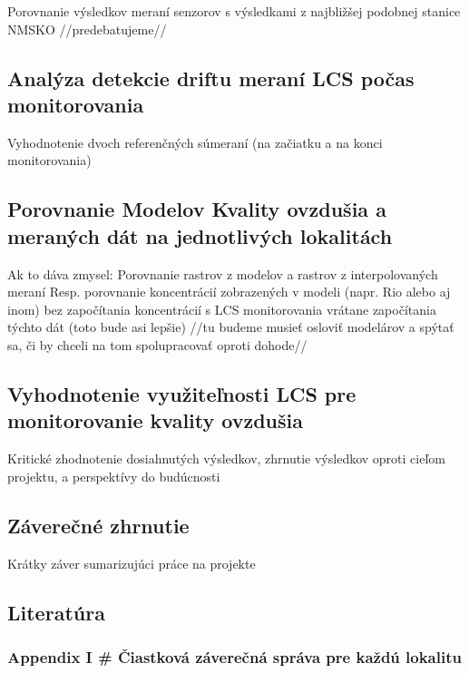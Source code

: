 \documentclass[
  slovak,
  letterpaper,
  DIV=11,
  numbers=noendperiod]{scrartcl}
\begin{document}
Porovnanie výsledkov meraní senzorov s výsledkami z najbližšej podobnej
stanice NMSKO //predebatujeme//

\subsection{Analýza detekcie driftu meraní LCS počas
monitorovania}\label{analuxfdza-detekcie-driftu-meranuxed-lcs-poux10das-monitorovania}

Vyhodnotenie dvoch referenčných súmeraní (na začiatku a na konci
monitorovania)

\subsection{Porovnanie Modelov Kvality ovzdušia a meraných dát na
jednotlivých
lokalitách}\label{porovnanie-modelov-kvality-ovzduux161ia-a-meranuxfdch-duxe1t-na-jednotlivuxfdch-lokalituxe1ch}

Ak to dáva zmysel: Porovnanie rastrov z modelov a rastrov z
interpolovaných meraní Resp. porovnanie koncentrácií zobrazených v
modeli (napr. Rio alebo aj inom) bez započítania koncentrácií s LCS
monitorovania vrátane započítania týchto dát (toto bude asi lepšie) //tu
budeme musieť osloviť modelárov a spýtať sa, či by chceli na tom
spolupracovať oproti dohode//

\subsection{Vyhodnotenie využiteľnosti LCS pre monitorovanie kvality
ovzdušia}\label{vyhodnotenie-vyuux17eiteux13enosti-lcs-pre-monitorovanie-kvality-ovzduux161ia}

Kritické zhodnotenie dosiahnutých výsledkov, zhrnutie výsledkov oproti
cieľom projektu, a perspektívy do budúcnosti

\subsection{Záverečné zhrnutie}\label{zuxe1vereux10dnuxe9-zhrnutie}

Krátky záver sumarizujúci práce na projekte

\subsection{Literatúra}\label{literatuxfara}

\subsubsection{Appendix I \# Čiastková záverečná správa pre každú
lokalitu}\label{appendix-i-ux10diastkovuxe1-zuxe1vereux10dnuxe1-spruxe1va-pre-kaux17eduxfa-lokalitu}
\end{document}
